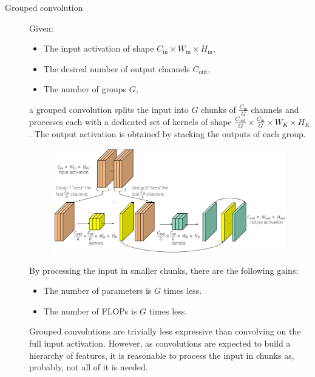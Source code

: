 \begin{description}
    \item[Grouped convolution] 
        Given:
        \begin{itemize}
            \item The input activation of shape $C_\text{in} \times W_\text{in} \times H_\text{in}$,\item The desired number of output channels $C_\text{out}$,
            \item The number of groups $G$,
        \end{itemize} 
        a grouped convolution splits the input into $G$ chunks of $\frac{C_\text{in}}{G}$ channels and processes each with a dedicated set of kernels of shape $\frac{C_\text{out}}{G} \times \frac{C_\text{in}}{G} \times W_K \times H_K$. The output activation is obtained by stacking the outputs of each group.

        \begin{figure}[H]
            \centering
            \includegraphics[width=0.7\linewidth]{./img/_grouped_conv.pdf}
        \end{figure}

        By processing the input in smaller chunks, there are the following gains:
        \begin{itemize}
            \item The number of parameters is $G$ times less.
            \item The number of FLOPs is $G$ times less.
        \end{itemize}

        \begin{remark}
            Grouped convolutions are trivially less expressive than convolving on the full input activation. However, as convolutions are expected to build a hierarchy of features, it is reasonable to process the input in chunks as, probably, not all of it is needed.
        \end{remark}
\end{description}

